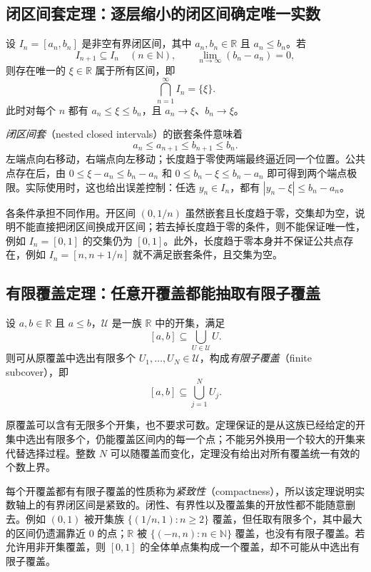\documentclass[UTF8,12pt,a4paper,fontset=fandol]{ctexart}
\begin{document}
\subsection{闭区间套定理：逐层缩小的闭区间确定唯一实数}

\begin{theorem}[闭区间套定理]
  \label{thm:nested-intervals}
  设 $I_n=[a_n,b_n]$ 是非空有界闭区间，其中 $a_n,b_n\in\mathbb R$ 且 $a_n\leq b_n$。若
  \[
    I_{n+1}\subseteq I_n\quad(n\in\mathbb N),
    \qquad \lim_{n\to\infty}(b_n-a_n)=0,
  \]
  则存在唯一的 $\xi\in\mathbb R$ 属于所有区间，即
  \[
    \bigcap_{n=1}^{\infty}I_n=\{\xi\}.
  \]
  此时对每个 $n$ 都有 $a_n\leq\xi\leq b_n$，且 $a_n\to\xi$、$b_n\to\xi$。
\end{theorem}

\emph{闭区间套}（nested closed intervals）的嵌套条件意味着
\[
  a_n\leq a_{n+1}\leq b_{n+1}\leq b_n.
\]
左端点向右移动，右端点向左移动；长度趋于零使两端最终逼近同一个位置。公共点存在后，由 $0\leq\xi-a_n\leq b_n-a_n$ 和 $0\leq b_n-\xi\leq b_n-a_n$ 即可得到两个端点极限。实际使用时，这也给出误差控制：任选 $y_n\in I_n$，都有 $|y_n-\xi|\leq b_n-a_n$。

各条件承担不同作用。开区间 $(0,1/n)$ 虽然嵌套且长度趋于零，交集却为空，说明不能直接把闭区间换成开区间；若去掉长度趋于零的条件，则不能保证唯一性，例如 $I_n=[0,1]$ 的交集仍为 $[0,1]$。此外，长度趋于零本身并不保证公共点存在，例如 $I_n=[n,n+1/n]$ 就不满足嵌套条件，且交集为空。

\subsection{有限覆盖定理：任意开覆盖都能抽取有限子覆盖}

\begin{theorem}[有限覆盖定理]
  \label{thm:finite-cover}
  设 $a,b\in\mathbb R$ 且 $a\leq b$，$\mathcal U$ 是一族 $\mathbb R$ 中的开集，满足
  \[
    [a,b]\subseteq\bigcup_{U\in\mathcal U}U.
  \]
  则可从原覆盖中选出有限多个 $U_1,\ldots,U_N\in\mathcal U$，构成\emph{有限子覆盖}（finite subcover），即
  \[
    [a,b]\subseteq\bigcup_{j=1}^{N}U_j.
  \]
\end{theorem}

原覆盖可以含有无限多个开集，也不要求可数。定理保证的是从这族已经给定的开集中选出有限多个，仍能覆盖区间内的每一个点；不能另外换用一个较大的开集来代替选择过程。整数 $N$ 可以随覆盖而变化，定理没有给出对所有覆盖统一有效的个数上界。

每个开覆盖都有有限子覆盖的性质称为\emph{紧致性}（compactness），所以该定理说明实数轴上的有界闭区间是紧致的。闭性、有界性以及覆盖集的开放性都不能随意删去。例如 $(0,1)$ 被开集族 $\{(1/n,1):n\geq2\}$ 覆盖，但任取有限多个，其中最大的区间仍遗漏靠近 $0$ 的点；$\mathbb R$ 被 $\{(-n,n):n\in\mathbb N\}$ 覆盖，也没有有限子覆盖。若允许用非开集覆盖，则 $[0,1]$ 的全体单点集构成一个覆盖，却不可能从中选出有限子覆盖。
\end{document}
